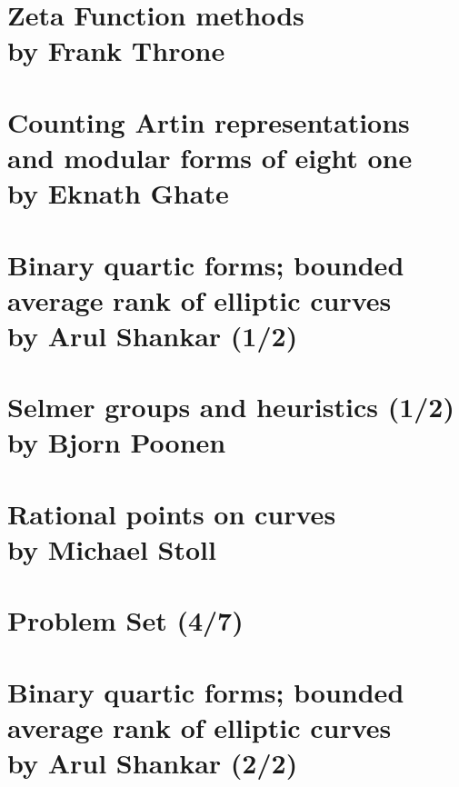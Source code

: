 \documentclass[12pt,amsfont]{amsart}
\begin{document}
\newpage
\renewcommand{\thesubsection}{\arabic{section}.\arabic{subsection}}
\section{Zeta Function methods\\by Frank Throne }\label{20}

\newpage
\section{Counting Artin representations and modular forms of eight one
 \\by  Eknath Ghate}\label{21}

\begingroup
\renewcommand{\addcontentsline}[3]{}%
\endgroup


\newpage
\renewcommand{\thesubsection}{\arabic{section}.\arabic{subsection}}
\section{Binary quartic forms; bounded average rank of elliptic curves
\\ by Arul Shankar (1/2)}\label{22}


\newpage
\renewcommand{\thesubsection}{\arabic{section}.\arabic{subsection}}
\section{Selmer groups and heuristics (1/2)\\ by Bjorn Poonen}\label{23}

\newpage
\renewcommand{\thesubsection}{\arabic{section}.\arabic{subsection}}
\section{Rational points on curves\\by Michael Stoll}\label{24}

\newpage
\renewcommand{\thesubsection}{\arabic{section}.\arabic{subsection}}
\section{Problem Set (4/7)}\label{25}

\newpage
\section{Binary quartic forms; bounded average rank of elliptic curves
\\ by Arul Shankar (2/2)}\label{26}
\end{document}
